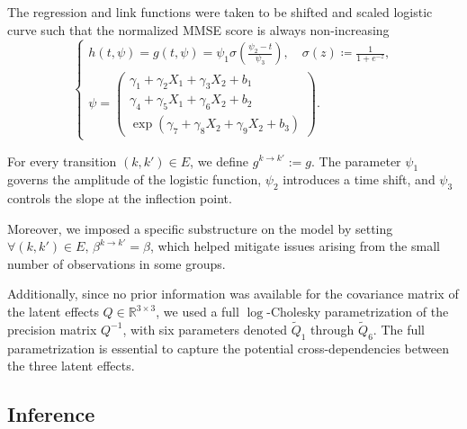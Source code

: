 \documentclass{sn-jnl}
\begin{document}
The regression and link functions were taken to be shifted and scaled logistic curve such that the normalized MMSE score is always non-increasing
\[
\begin{cases}
    h(t, \psi) = g(t, \psi) = \psi_1 \sigma \left(\frac{\psi_2 - t}{\psi_3} \right),  \quad \sigma(z) \coloneqq \frac{1}{1 + e^{-z}}, \\
    \psi =
    \begin{pmatrix}
        \gamma_1 + \gamma_2 X_1 + \gamma_3 X_2 + b_1   \\
        \gamma_4 + \gamma_5 X_1 + \gamma_6 X_2 + b_2   \\
        \exp(\gamma_7 + \gamma_8 X_2 + \gamma_9 X_2 + b_3)
    \end{pmatrix}.
\end{cases}
\]

For every transition $(k,k') \in E$, we define $g^{k \to k'} := g$. The parameter $\psi_1$ governs the amplitude of the logistic function, $\psi_2$ introduces a time shift, and $\psi_3$ controls the slope at the inflection point.

Moreover, we imposed a specific substructure on the model by setting $\forall (k, k') \in E, \, \beta^{k \to k'} = \beta$, which helped mitigate issues arising from the small number of observations in some groups. 

Additionally, since no prior information was available for the covariance matrix of the latent effects $Q \in \mathbb{R}^{3 \times 3}$, we used a full $\log$-Cholesky parametrization of the precision matrix $Q^{-1}$, with six parameters denoted $\tilde{Q}_1$ through $\tilde{Q}_6$. The full parametrization is essential to capture the potential cross-dependencies between the three latent effects.

\subsection{Inference} \label{subsec:paquid-inference}
\end{document}
